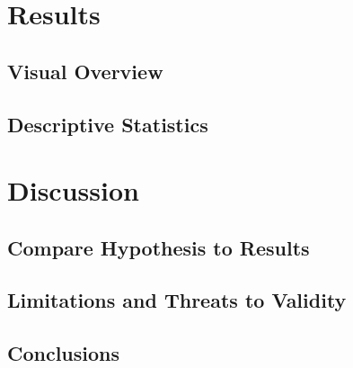 \documentclass{article}
\begin{document}
\section{Results}

\subsection{Visual Overview}

\subsection{Descriptive Statistics}
\label{stats}

\section{Discussion}

\subsection{Compare Hypothesis to Results}

\subsection{Limitations and Threats to Validity}

\subsection{Conclusions}
\end{document}
